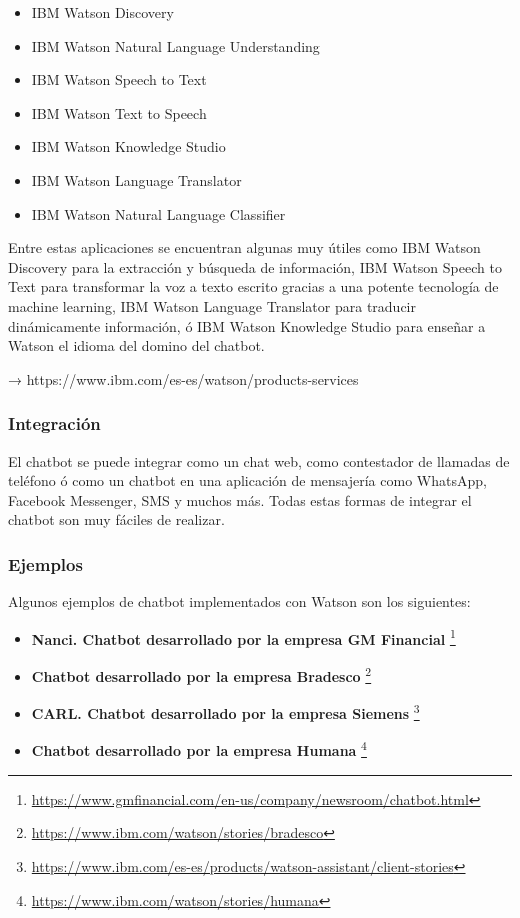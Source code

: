 \begin{itemize}
    \item IBM Watson Discovery
    \item IBM Watson Natural Language Understanding
    \item IBM Watson Speech to Text
    \item IBM Watson Text to Speech
    \item IBM Watson Knowledge Studio
    \item IBM Watson Language Translator
    \item IBM Watson Natural Language Classifier
\end{itemize}

Entre estas aplicaciones se encuentran algunas muy útiles como IBM Watson Discovery para la extracción y búsqueda de información, IBM Watson Speech to Text para transformar la voz a texto escrito gracias a una potente tecnología de machine learning, IBM Watson Language Translator para traducir dinámicamente información, ó IBM Watson Knowledge Studio para enseñar a Watson el idioma del domino del chatbot.



→ https://www.ibm.com/es-es/watson/products-services

\subsubsection*{Integración}

El chatbot se puede integrar como un chat web, como contestador de llamadas de teléfono ó como un chatbot en una aplicación de mensajería como WhatsApp, Facebook Messenger, SMS y muchos más. Todas estas formas de integrar el chatbot son muy fáciles de realizar.

\subsubsection*{Ejemplos}

Algunos ejemplos de chatbot implementados con Watson son los siguientes:

\begin{itemize}
    \item \textbf{Nanci. Chatbot desarrollado por la empresa GM Financial} \footnote{\url{https://www.gmfinancial.com/en-us/company/newsroom/chatbot.html}}
    \item \textbf{Chatbot desarrollado por la empresa Bradesco} \footnote{\url{https://www.ibm.com/watson/stories/bradesco}}
    \item \textbf{CARL. Chatbot desarrollado por la empresa Siemens} \footnote{\url{https://www.ibm.com/es-es/products/watson-assistant/client-stories}}
    \item \textbf{Chatbot desarrollado por la empresa Humana} \footnote{\url{https://www.ibm.com/watson/stories/humana}}
\end{itemize}




